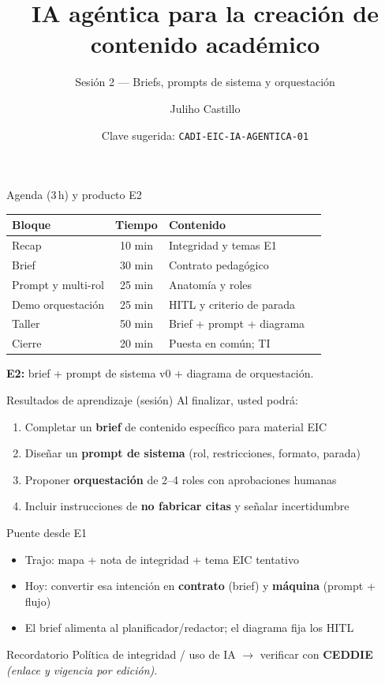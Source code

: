 \documentclass[aspectratio=169,11pt]{beamer}
\title{IA agéntica para la creación de contenido académico}
\subtitle{Sesión 2 --- Briefs, prompts de sistema y orquestación}
\author{Juliho Castillo}
\institute{CADi 40\,h · Escuela de Ingeniería y Ciencias\\
Tecnológico de Monterrey}
\date{Clave sugerida: \texttt{CADI-EIC-IA-AGENTICA-01}}
\begin{document}
\begin{frame}
\titlepage
\end{frame}

\begin{frame}{Agenda (3\,h) y producto E2}
\begin{tabularx}{\textwidth}{@{}lclX@{}}
\toprule
Bloque & Tiempo & Contenido \\
\midrule
Recap & 10 min & Integridad y temas E1 \\
Brief & 30 min & Contrato pedagógico \\
Prompt y multi-rol & 25 min & Anatomía y roles \\
Demo orquestación & 25 min & HITL y criterio de parada \\
Taller & 50 min & Brief + prompt + diagrama \\
Cierre & 20 min & Puesta en común; TI \\
\bottomrule
\end{tabularx}
\vspace{0.5em}
\textbf{E2:} brief + prompt de sistema v0 + diagrama de orquestación.
\end{frame}

\begin{frame}{Resultados de aprendizaje (sesión)}
Al finalizar, usted podrá:
\begin{enumerate}
\item Completar un \textbf{brief} de contenido específico para material EIC
\item Diseñar un \textbf{prompt de sistema} (rol, restricciones, formato, parada)
\item Proponer \textbf{orquestación} de 2--4 roles con aprobaciones humanas
\item Incluir instrucciones de \textbf{no fabricar citas} y señalar incertidumbre
\end{enumerate}
\end{frame}

\begin{frame}{Puente desde E1}
\begin{itemize}
\item Trajo: mapa + nota de integridad + tema EIC tentativo
\item Hoy: convertir esa intención en \textbf{contrato} (brief) y \textbf{máquina} (prompt + flujo)
\item El brief alimenta al planificador/redactor; el diagrama fija los HITL
\end{itemize}
\begin{block}{Recordatorio}
Política de integridad / uso de IA $\rightarrow$ verificar con \textbf{CEDDIE} \emph{(enlace y vigencia por edición)}.
\end{block}
\end{frame}
\end{document}
